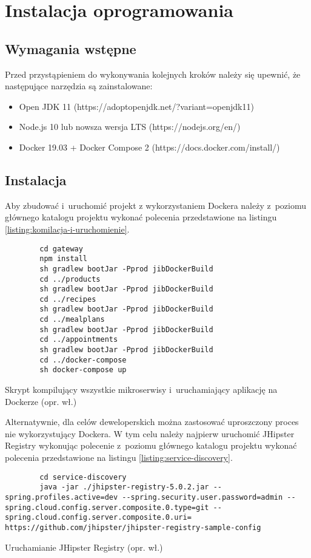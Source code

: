 \section{Instalacja oprogramowania}\label{sec:software-installation}
\subsection{Wymagania wstępne}\label{subsec:prerequirements}
Przed przystąpieniem do wykonywania kolejnych kroków należy się upewnić, że następujące narzędzia są zainstalowane:
\begin{itemize}
    \item Open JDK 11 (https://adoptopenjdk.net/?variant=openjdk11)
    \item Node.js 10 lub nowsza wersja LTS (https://nodejs.org/en/)
    \item Docker 19.03 + Docker Compose 2 (https://docs.docker.com/install/)
\end{itemize}

\subsection{Instalacja}\label{subsec:installation}

Aby zbudować i~uruchomić projekt z wykorzystaniem Dockera należy z~poziomu głównego katalogu projektu
wykonać polecenia przedstawione na listingu \ref{listing:komilacja-i-uruchomienie}.
\begin{listing}[h!]
    \begin{verbatim}
        cd gateway
        npm install
        sh gradlew bootJar -Pprod jibDockerBuild
        cd ../products
        sh gradlew bootJar -Pprod jibDockerBuild
        cd ../recipes
        sh gradlew bootJar -Pprod jibDockerBuild
        cd ../mealplans
        sh gradlew bootJar -Pprod jibDockerBuild
        cd ../appointments
        sh gradlew bootJar -Pprod jibDockerBuild
        cd ../docker-compose
        sh docker-compose up
    \end{verbatim}
    \centering\caption{Skrypt kompilujący wszystkie mikroserwisy i~uruchamiający aplikację na Dockerze (opr. wł.)}\label{listing:komilacja-i-uruchomienie}
\end{listing}

Alternatywnie, dla celów deweloperskich można zastosować uproszczony proces nie wykorzystujący Dockera.
W tym celu należy najpierw uruchomić JHipster Registry wykonując polecenie z~poziomu głównego katalogu projektu
wykonać polecenia przedstawione na listingu \ref{listing:service-discovery}.
\begin{listing}[h!]
    \begin{verbatim}
        cd service-discovery
        java -jar ./jhipster-registry-5.0.2.jar --spring.profiles.active=dev --spring.security.user.password=admin --spring.cloud.config.server.composite.0.type=git --spring.cloud.config.server.composite.0.uri= https://github.com/jhipster/jhipster-registry-sample-config
    \end{verbatim}
    \centering\caption{Uruchamianie JHipster Registry (opr. wł.)}\label{listing:service-discovery}
\end{listing}

